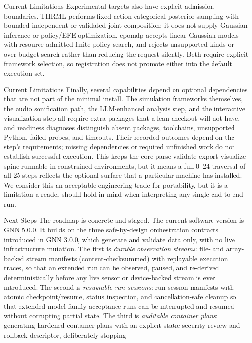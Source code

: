 \documentclass[
  ignorenonframetext,
]{beamer}
\begin{document}
\begin{frame}{Current Limitations}
Experimental targets also have explicit admission boundaries. THRML
performs fixed-action categorical posterior sampling with bounded
independent or validated joint composition; it does not supply Gaussian
inference or policy/EFE optimization. cpomdp accepts linear-Gaussian
models with resource-admitted finite policy search, and rejects
unsupported kinds or over-budget search rather than reducing the request
silently. Both require explicit framework selection, so registration
does not promote either into the default execution set.

\end{frame}

\begin{frame}{Current Limitations}
Finally, several capabilities depend on optional dependencies that are
not part of the minimal install. The simulation frameworks themselves,
the audio sonification path, the LLM-enhanced analysis step, and the
interactive visualization step all require extra packages that a lean
checkout will not have, and readiness diagnoses distinguish absent
packages, toolchains, unsupported Python, failed probes, and timeouts.
Their recorded outcomes depend on the step's requirements; missing
dependencies or required unfinished work do not establish successful
execution. This keeps the core parse-validate-export-visualize spine
runnable in constrained environments, but it means a full 0--24
traversal of all 25 steps reflects the optional surface that a
particular machine has installed. We consider this an acceptable
engineering trade for portability, but it is a limitation a reader
should hold in mind when interpreting any single end-to-end run.
\end{frame}

\begin{frame}[allowframebreaks]{Next Steps}
\protect{}\label{next-steps}
The roadmap is concrete and staged. The current software version is GNN
5.0.0. It builds on the three safe-by-design orchestration contracts
introduced in GNN 3.0.0, which generate and validate data only, with no
live infrastructure mutation. The first is \emph{durable observation
streams}: file- and array-backed stream manifests (content-checksummed)
with replayable execution traces, so that an extended run can be
observed, paused, and re-derived deterministically before any live
sensor or device-backed stream is ever introduced. The second is
\emph{resumable run sessions}: run-session manifests with atomic
checkpoint/resume, status inspection, and cancellation-safe cleanup so
that extended model-family acceptance runs can be interrupted and
resumed without corrupting partial state. The third is \emph{auditable
container plans}: generating hardened container plans with an explicit
static security-review and rollback descriptor, deliberately stopping
\end{frame}
\end{document}
